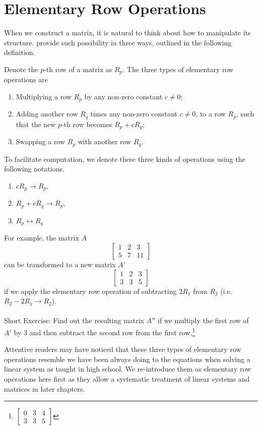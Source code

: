 \section{Elementary Row Operations}
When we construct a matrix, it is natural to think about how to manipulate its structure.  provide such possibility in three ways, outlined in the following definition.
\begin{defn}
\label{defn:elerowop}
Denote the $p$-th row of a matrix as $R_{p}$. The three types of elementary row operations are
\begin{enumerate}
\item Multiplying a row $R_{p}$ by any non-zero constant $c \neq 0$;
\item Adding another row $R_{q}$ times any non-zero constant $c \neq 0$, to a row $R_{p}$, such that the new $p$-th row becomes $R_{p} + cR_{q}$;
\item Swapping a row $R_{p}$ with another row $R_{q}$.
\end{enumerate}
To facilitate computation, we denote these three kinds of operations using the following notations.
\begin{enumerate}
\item $cR_{p} \rightarrow R_{p}$,
\item $R_{p} + cR_{q} \rightarrow R_{p}$,
\item $R_{p} \leftrightarrow R_{q}$
\end{enumerate}
\end{defn}
For example, the matrix $A$
\begin{equation*}
\begin{bmatrix}
1 & 2 & 3 \\
5 & 7 & 11
\end{bmatrix}
\end{equation*}
can be transformed to a new matrix $A'$
\begin{equation*}
\begin{bmatrix}
1 & 2 & 3 \\
3 & 3 & 5
\end{bmatrix}
\end{equation*}
if we apply the elementary row operation of subtracting $2R_1$ from $R_2$  (i.e.\ $R_2 - 2R_1 \to R_2$). \\
\\
Short Exercise: Find out the resulting matrix $A''$ if we multiply the first row of $A'$ by $3$ and then subtract the second row from the first row.\footnote{
$\begin{bmatrix}
0 & 3 & 4 \\
3 & 3 & 5
\end{bmatrix}$}\par
Attentive readers may have noticed that these three types of elementary row operations resemble we have been always doing to the equations when solving a linear system as taught in high school. We re-introduce them as elementary row operations here first as they allow a systematic treatment of linear systems and matrices in later chapters.


